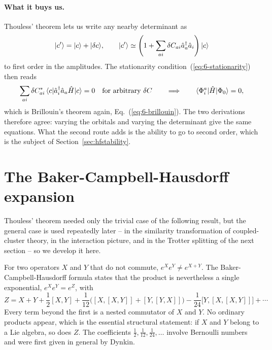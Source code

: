 \paragraph{What it buys us.}
Thouless' theorem lets us write any nearby determinant as
\begin{equation}
  \vert c' \rangle = \vert c \rangle + \vert \delta c \rangle,
  \qquad
  \vert c' \rangle \simeq \left(1+\sum_{ai}\delta C_{ai}
    \hat{a}^{\dagger}_{a}\hat{a}_{i}\right)\vert c \rangle
  \label{eq:6-firstvariation}
\end{equation}
to first order in the amplitudes.  The stationarity
condition~(\ref{eq:6-stationarity}) then reads
\begin{equation}
  \sum_{ai}\delta C^{*}_{ai}\,
    \langle c | \hat{a}^{\dagger}_{i}\hat{a}_{a}\hat{H} | c \rangle = 0
  \quad\text{for arbitrary }\delta C
  \qquad\Longrightarrow\qquad
  \langle \Phi_i^a | \hat{H} | \Phi_0 \rangle = 0 ,
  \label{eq:6-hfcondition}
\end{equation}
which is Brillouin's theorem again, Eq.~(\ref{eq:6-brillouin}).  The two
derivations therefore agree: varying the orbitals and varying the determinant
give the same equations.  What the second route adds is the ability to go to
second order, which is the subject of Section~\ref{sec:hfstability}.

\section{The Baker-Campbell-Hausdorff expansion}
\label{sec:bch}

Thouless' theorem needed only the trivial case of the following result, but
the general case is used repeatedly later -- in the similarity transformation
of coupled-cluster theory, in the interaction picture, and in the Trotter
splitting of the next section -- so we develop it here.

For two operators $X$ and $Y$ that do not commute, $e^{X}e^{Y}\ne e^{X+Y}$.
The Baker-Campbell-Hausdorff formula states that the product is nevertheless
a single exponential, $e^{X}e^{Y}=e^{Z}$, with
\begin{equation}
  Z = X + Y + \frac{1}{2}[X,Y]
    + \frac{1}{12}\Big([X,[X,Y]] + [Y,[Y,X]]\Big)
    - \frac{1}{24}\big[Y,[X,[X,Y]]\big] + \cdots
  \label{eq:6-bch}
\end{equation}
Every term beyond the first is a nested commutator of $X$ and $Y$.  No
ordinary products appear, which is the essential structural statement: if $X$
and $Y$ belong to a Lie algebra, so does $Z$.  The coefficients
$\tfrac12,\tfrac1{12},\tfrac1{24},\dots$ involve Bernoulli numbers and were
first given in general by Dynkin.

